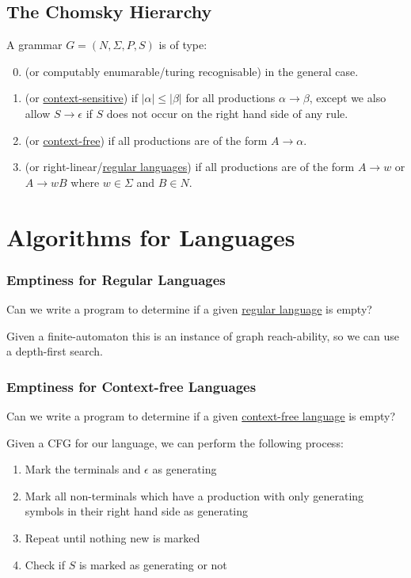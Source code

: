 \documentclass{article}
\begin{document}
\subsection{The Chomsky Hierarchy}
A grammar $G = (N, \Sigma, P, S)$ is of type:
\begin{enumerate}
    \setcounter{enumi}{-1}
    \item (or computably enumarable/turing recognisable) in the general case.
    \item (or \hyperref[context-sensitive]{context-sensitive}) if $|\alpha| \leq |\beta|$ for all productions $\alpha \to \beta$, except we also allow $S \to \epsilon$ if $S$ does not occur on the right hand side of any rule.
    \item (or \hyperref[cfg]{context-free}) if all productions are of the form $A \to \alpha$.
    \item (or right-linear/\hyperref[regular-languages]{regular languages}) if all productions are of the form $A \to w$ or $A \to wB$ where $w \in \Sigma$ and $B \in N$.
\end{enumerate}

\newpage

\section{Algorithms for Languages}
\subsubsection{Emptiness for Regular Languages}
Can we write a program to determine if a given \hyperref[regular-languages]{regular language} is empty?

Given a finite-automaton this is an instance of graph reach-ability, so we can use a depth-first search.

\subsubsection{Emptiness for Context-free Languages}
Can we write a program to determine if a given \hyperref[cfg]{context-free language} is empty?

Given a CFG for our language, we can perform the following process:
\begin{enumerate}
    \item Mark the terminals and $\epsilon$ as generating
    \item Mark all non-terminals which have a production with only generating symbols in their right hand side as generating
    \item Repeat until nothing new is marked
    \item Check if $S$ is marked as generating or not
\end{enumerate}
\end{document}
